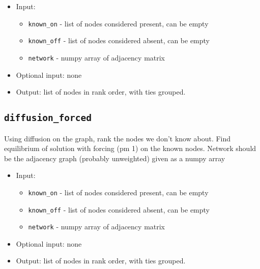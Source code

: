 \documentclass[10pt]{article}
\theoremstyle{definition}
\numberwithin{theorem}{section}
\numberwithin{definition}{section}
\numberwithin{lemma}{section}
\numberwithin{corollary}{section}
\numberwithin{clm}{section}
\numberwithin{rmk}{section}
\begin{document}
\begin{itemize}
	\item Input: 
		\begin{itemize}
		\item \verb|known_on| - list of nodes considered present, can be empty
		\item \verb|known_off| - list of nodes considered absent, can be empty
		\item \verb|network| - numpy array of adjacency matrix
	\end{itemize}
	\item Optional input: none
	\item Output:  list of nodes in rank order, with ties grouped.
\end{itemize}

\cprotect \subsection{\verb|diffusion_forced|}
Using diffusion on the graph, rank the nodes we don't know about. Find equilibrium
of solution with forcing (pm 1) on the known nodes. Network should be
the adjacency graph (probably unweighted) given as a numpy array

\begin{itemize}
	\item Input: 
	\begin{itemize}
		\item \verb|known_on| - list of nodes considered present, can be empty
		\item \verb|known_off| - list of nodes considered absent, can be empty
		\item \verb|network| - numpy array of adjacency matrix
	\end{itemize}
	\item Optional input: none
	\item Output:  list of nodes in rank order, with ties grouped.
\end{itemize}
\end{document}
